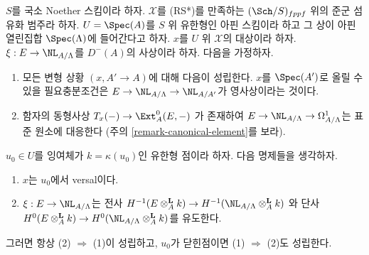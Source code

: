 \begin{lemma}
\label{lemma-characterize-versal}
$S$를 국소 Noether 스킴이라 하자. $\mathcal{X}$를 (RS*)를 만족하는
$(\Sch/S)_{fppf}$ 위의 준군 섬유화 범주라 하자.
$U = \Spec(A)$를 $S$ 위 유한형인 아핀 스킴이라 하고 그 상이
아핀 열린집합 $\Spec(\Lambda)$에 들어간다고 하자.
$x$를 $U$ 위 $\mathcal{X}$의 대상이라 하자.
$\xi : E \to \NL_{A/\Lambda}$를 $D^{-}(A)$의 사상이라 하자.
다음을 가정하자.
\begin{enumerate}
\item[(i)] 모든 변형 상황 $(x, A' \to A)$에 대해 다음이 성립한다.
$x$를 $\Spec(A')$로 올릴 수 있을 필요충분조건은
$E \to \NL_{A/\Lambda} \to \NL_{A/A'}$가 영사상이라는 것이다.
\item[(ii)] 함자의 동형사상
$T_x(-) \to \Ext^0_A(E, -)$
가 존재하여 $E \to \NL_{A/\Lambda} \to \Omega^1_{A/\Lambda}$는
표준 원소에 대응한다 (주의 \ref{remark-canonical-element}를 보라).
\end{enumerate}
$u_0 \in U$를 잉여체가 $k = \kappa(u_0)$인 유한형 점이라 하자.
다음 명제들을 생각하자.
\begin{enumerate}
\item $x$는 $u_0$에서 versal이다.
\item $\xi : E \to \NL_{A/\Lambda}$는 전사
$H^{-1}(E \otimes_A^{\mathbf{L}} k) \to
H^{-1}(\NL_{A/\Lambda} \otimes_A^{\mathbf{L}} k)$
와 단사
$H^0(E \otimes_A^{\mathbf{L}} k) \to
H^0(\NL_{A/\Lambda} \otimes_A^{\mathbf{L}} k)$를 유도한다.
\end{enumerate}
그러면 항상 (2) $\Rightarrow$ (1)이 성립하고, $u_0$가 닫힌점이면
(1) $\Rightarrow$ (2)도 성립한다.
\end{lemma}

